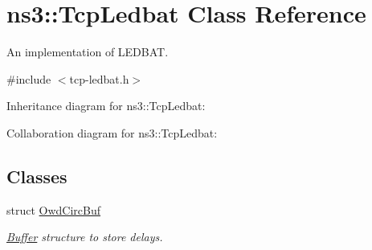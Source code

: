 \hypertarget{classns3_1_1TcpLedbat}{}\section{ns3\+:\+:Tcp\+Ledbat Class Reference}
\label{classns3_1_1TcpLedbat}


An implementation of L\+E\+D\+B\+AT.  




{\ttfamily \#include $<$tcp-\/ledbat.\+h$>$}



Inheritance diagram for ns3\+:\+:Tcp\+Ledbat\+:


Collaboration diagram for ns3\+:\+:Tcp\+Ledbat\+:
\subsection*{Classes}
\begin{DoxyCompactItemize}
\item 
struct \hyperlink{structns3_1_1TcpLedbat_1_1OwdCircBuf}{Owd\+Circ\+Buf}
\begin{DoxyCompactList}\small\item\em \hyperlink{classns3_1_1Buffer}{Buffer} structure to store delays. \end{DoxyCompactList}\end{DoxyCompactItemize}
